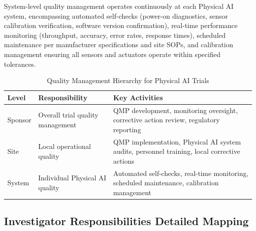 System-level quality management operates continuously at each Physical AI
system, encompassing automated self-checks (power-on diagnostics, sensor
calibration verification, software version confirmation), real-time performance
monitoring (throughput, accuracy, error rates, response times), scheduled
maintenance per manufacturer specifications and site SOPs, and calibration
management ensuring all sensors and actuators operate within specified
tolerances.

\begin{table}[H]
\centering
\caption{Quality Management Hierarchy for Physical AI Trials}
\label{tab:ich-quality}
\small
\begin{tabularx}{\textwidth}{l X X}
\toprule
\textbf{Level} & \textbf{Responsibility} & \textbf{Key Activities} \\
\midrule
Sponsor & Overall trial quality management & QMP development, monitoring oversight, corrective action review, regulatory reporting \\
Site & Local operational quality & QMP implementation, Physical AI system audits, personnel training, local corrective actions \\
System & Individual Physical AI quality & Automated self-checks, real-time monitoring, scheduled maintenance, calibration management \\
\bottomrule
\end{tabularx}
\end{table}

\clearpage

\subsection{Investigator Responsibilities Detailed Mapping}
\label{subsec:ich-investigator-detail}


